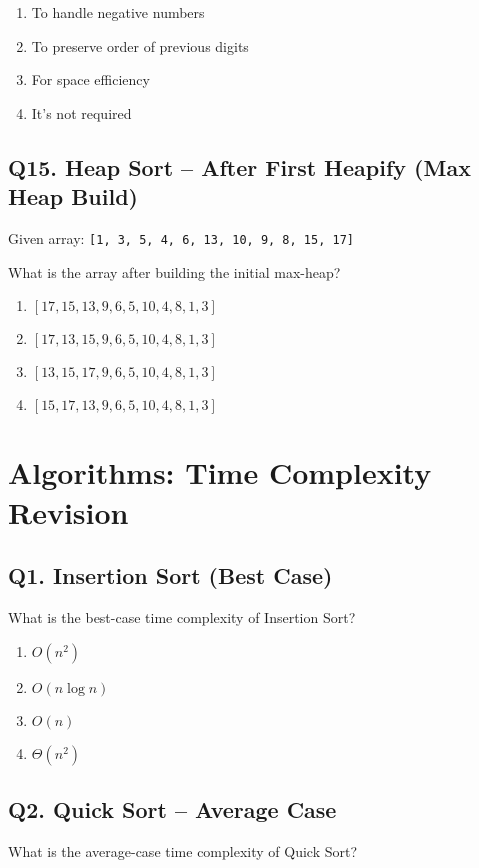 \begin{enumerate}[label=(\alph*)]
    \item To handle negative numbers
    \item To preserve order of previous digits
    \item For space efficiency
    \item It's not required
\end{enumerate}


\subsection*{Q15. Heap Sort – After First Heapify (Max Heap Build)}
Given array: \texttt{[1, 3, 5, 4, 6, 13, 10, 9, 8, 15, 17]}

What is the array after building the initial max-heap?

\begin{enumerate}[label=(\alph*)]
    \item $[17, 15, 13, 9, 6, 5, 10, 4, 8, 1, 3]$
    \item $[17, 13, 15, 9, 6, 5, 10, 4, 8, 1, 3]$
    \item $[13, 15, 17, 9, 6, 5, 10, 4, 8, 1, 3]$
    \item $[15, 17, 13, 9, 6, 5, 10, 4, 8, 1, 3]$
\end{enumerate}

\section{Algorithms: Time Complexity Revision}

\subsection*{Q1. Insertion Sort (Best Case)}
What is the best-case time complexity of Insertion Sort?

\begin{enumerate}[label=(\alph*)]
    \item \(O(n^2)\) \quad
    \item \(O(n \log n)\) \quad
    \item \(O(n)\) \quad
    \item \(\Theta(n^2)\)
\end{enumerate}


\subsection*{Q2. Quick Sort – Average Case}
What is the average-case time complexity of Quick Sort?

